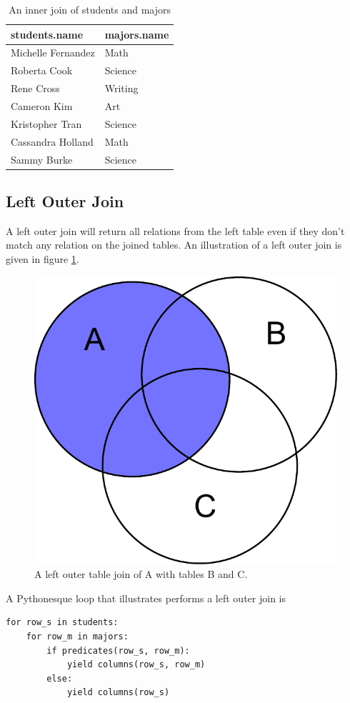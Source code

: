 \begin{table}
\begin{tabular}{|l|l|}
\hline
students.name & majors.name \\
\hline
Michelle Fernandez & Math \\
Roberta Cook & Science \\
Rene Cross & Writing \\
Cameron Kim & Art \\
Kristopher Tran & Science \\
Cassandra Holland & Math \\
Sammy Burke & Science \\
\hline
\end{tabular}
\caption{An inner join of students and majors}
\label{table:ij_studentsmajors}
\end{table}

\subsection*{Left Outer Join}
A left outer join will return all relations from the left table even if they don't match any relation on the joined tables.
An illustration of a left outer join is given in figure \ref{fig:left_outer}.
\begin{figure}
\centering
\includegraphics[width=.5\textwidth]{left_outer.pdf}
\caption{A left outer table join of A with tables B and C.}
\label{fig:left_outer}
\end{figure}

A Pythonesque loop that illustrates performs a left outer join is
\begin{lstlisting}
for row_s in students:
    for row_m in majors:
        if predicates(row_s, row_m):
            yield columns(row_s, row_m)
        else:
            yield columns(row_s)
\end{lstlisting}

